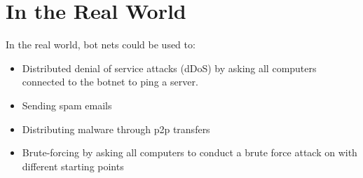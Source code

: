 \documentclass[12pt,a4paper]{article}
\begin{document}
\section{In the Real World}
In the real world, bot nets could be used to:
\begin{itemize}
\item Distributed denial of service attacks (dDoS) by asking all computers connected to the botnet to ping a server.
\item Sending spam emails
\item Distributing malware through p2p transfers
\item Brute-forcing by asking all computers to conduct a brute force attack on with different starting points
\end{itemize}
\end{document}
